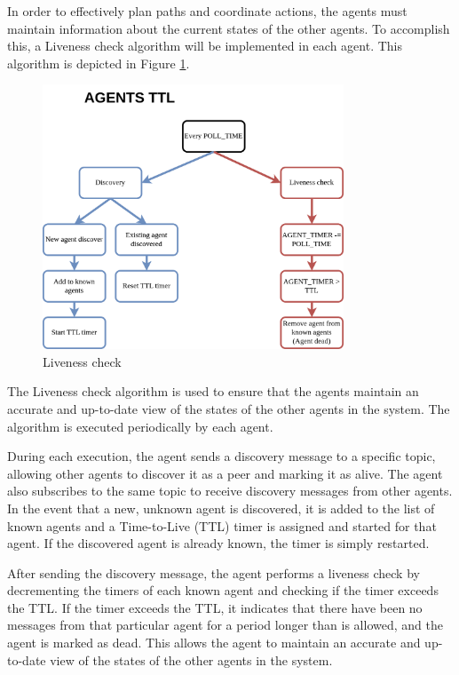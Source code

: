 In order to effectively plan paths and coordinate actions, the agents must maintain information about the current states of the other agents. To accomplish this, a Liveness check algorithm will be implemented in each agent. This algorithm is depicted in Figure \ref{fig:liveness_check}.
\begin{figure}[H]
    \centering
    \includegraphics[width=0.8\textwidth]{pictures/agent_ttl.png}
    \caption{ Liveness check }
    \label{fig:liveness_check}
\end{figure}

The Liveness check algorithm is used to ensure that the agents maintain an accurate and up-to-date view of the states of the other agents in the system. The algorithm is executed periodically by each agent.

During each execution, the agent sends a discovery message to a specific topic, allowing other agents to discover it as a peer and marking it as alive. The agent also subscribes to the same topic to receive discovery messages from other agents. In the event that a new, unknown agent is discovered, it is added to the list of known agents and a Time-to-Live (TTL) timer is assigned and started for that agent. If the discovered agent is already known, the timer is simply restarted.

After sending the discovery message, the agent performs a liveness check by decrementing the timers of each known agent and checking if the timer exceeds the TTL. If the timer exceeds the TTL, it indicates that there have been no messages from that particular agent for a period longer than is allowed, and the agent is marked as dead. This allows the agent to maintain an accurate and up-to-date view of the states of the other agents in the system.
